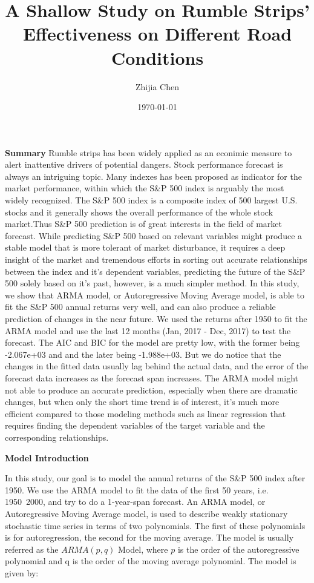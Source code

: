 \documentclass{article}
\title{A Shallow Study on Rumble Strips' Effectiveness on Different Road Conditions}
\author{Zhijia Chen}
\date{\today}
\begin{document}
\begin{titlepage}
    \maketitle
\end{titlepage}

\textbf{Summary}
Rumble strips has been widely applied as an econimic measure to alert inattentive drivers of potential dangers.
Stock performance forecast is always an intriguing topic. Many indexes has been proposed as indicator for the market performance, within which the S\&P 500 index is arguably the most widely recognized. The S\&P 500 index is a composite index of 500 largest U.S. stocks and it generally shows the overall performance of the whole stock market.Thus S\&P 500 prediction is of great interests in the field of market forecast. While predicting S\&P 500 based on relevant variables might produce a stable model that is more tolerant of market disturbance, it requires a deep insight of the market and tremendous efforts in sorting out accurate relationships between the index and it's dependent variables, predicting the future of the S\&P 500 solely based on it's past, however, is a much simpler method. In this study, we show that ARMA model, or Autoregressive Moving Average model, is able to fit the S\&P 500 annual returns very well, and can also produce a reliable prediction of changes in the near future. We used the returns after 1950 to fit the ARMA model and use the last 12 months (Jan, 2017 - Dec, 2017) to test the forecast. The AIC and BIC for the model are pretty low, with the former being -2.067e+03 and and the later being -1.988e+03. But we do notice that the changes in the fitted data usually lag behind the actual data, and the error of the forecast data increases as the forecast span increases. The ARMA model might not able to produce an accurate prediction, especially when there are dramatic changes, but when only the short time trend is of interest, it's much more efficient compared to those modeling methods such as linear regression that requires finding the dependent variables of the target variable and the corresponding relationships.

\vspace{\baselineskip}
\textbf{Model Introduction}

In this study, our goal is to model the annual returns of the S\&P 500 index after 1950. We use the ARMA model to fit the data of the first 50 years, i.e. 1950~2000, and try to do a 1-year-span forecast. An ARMA model, or Autoregressive Moving Average model, is used to describe weakly stationary stochastic time series in terms of two polynomials. The first of these polynomials is for autoregression, the second for the moving average\cite{arma}. The model is usually referred as the $ARMA(p,q)$ Model, where $p$ is the order of the autoregressive polynomial and q is the order of the moving average polynomial. The model is given by:
\end{document}
